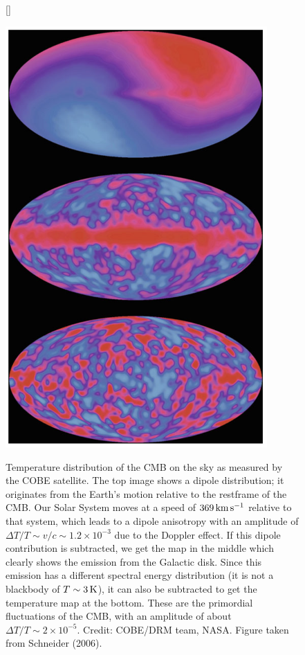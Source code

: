 \documentclass[a4paper,11pt]{article}
\begin{document}
\begin{figure}[t]
    [\FBwidth]
    {\caption{\footnotesize{Temperature distribution of the CMB on the sky as measured by the COBE satellite. The top image shows a dipole distribution; it originates from the Earth's motion relative to the restframe of the CMB. Our Solar System moves at a speed of $369\,{\rm km\,s^{-1}}$ relative to that system, which leads to a dipole anisotropy with an amplitude of $\Delta T/T\sim v/c\sim1.2\times10^{-3}$ due to the Doppler effect. If this dipole contribution is subtracted, we get the map in the middle which clearly shows the emission from the Galactic disk. Since this emission has a different spectral energy distribution (it is not a blackbody of $T\sim3\,{\rm K}$), it can also be subtracted to get the temperature map at the bottom. These are the primordial fluctuations of the CMB, with an amplitude of about  $\Delta T/T\sim2\times10^{-5}$. Credit: COBE/DRM team, NASA. Figure taken from Schneider (2006).}}
    \label{fig:cmbcobe}}
    {\includegraphics[width=10cm]{figures/CMBCOBE.png}}
\end{figure}
\end{document}
